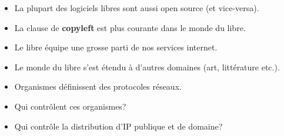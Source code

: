 \begin{frame}
	\begin{itemize}
		\item La plupart des logiciels libres sont aussi open source (et vice-versa).
		\item La clause de \textbf{copyleft} est plus courante dans le monde du libre.
		\item Le libre équipe une grosse parti de nos services internet.
		\item Le monde du libre s'est étendu à d'autres domaines (art, littérature etc.).
	\end{itemize}
\end{frame}

\begin{frame}
	\begin{itemize}
		\item Organismes définissent des protocoles réseaux.
		\item Qui contrôlent ces organismes?
		\item Qui contrôle la distribution d'IP publique et de domaine?
	\end{itemize}
\end{frame}